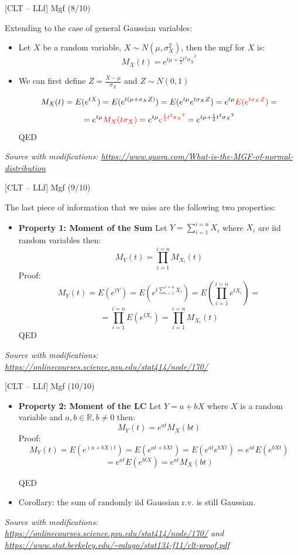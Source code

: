 \documentclass{beamer}
\begin{document}
\begin{frame}
{\centerline{[CLT -- LLf] Mgf (8/10)}}
Extending to the case of general Gaussian variables:
\begin{itemize}
\item Let $X$ be a random variable, $  X \sim N(\mu,\sigma_X^2)  $, then the mgf for $X$ is:
$$M_X(t) = e^{t\mu + \frac{1}{2}{t^2\sigma_X}^2}$$

\item We can first define $Z = \frac{X - \mu}{ \sigma_X}$ and $  Z \sim N(0,1) $

$$M_X(t) = E(e^{tX}) = E(e^{t(\mu + \sigma_XZ)}) =  E(e^{t\mu} e^{t\sigma_XZ}) = e^{t\mu} \textcolor{red}{E(e^{t\sigma_XZ})} =$$
$$ = e^{t\mu} \textcolor{red}{M_X(t\sigma_X)} =  e^{t\mu} \textcolor{red}{e^{\frac{1}{2}{t^2\sigma_X}^2}}= e^{t\mu + \frac{1}{2}{t^2\sigma_X}^2}$$
QED
\end{itemize}

\textit{\small
Source with modifications: \url{https://www.quora.com/What-is-the-MGF-of-normal-distribution}}
\end{frame}

\begin{frame}
{\centerline{[CLT -- LLf] Mgf (9/10)}}\label{S:MomentOfSum}
The last piece of information that we miss are the following two properties:
\begin{itemize}
\item  \textbf{Property 1: Moment of the Sum} Let $Y = \sum_{i=1}^{i=n} X_i$ where  $X_i$ are iid random variables then:
$$M_Y(t) = \prod_{i=1}^{i=n} M_{X_i}(t)$$
Proof:
$$M_Y(t) = E(e^{tY}) = E(e^{t\sum_{i=1}^{i=n} X_i}) = E(\prod_{i=1}^{i=n}e^{tX_i})=$$
$$ = \prod_{i=1}^{i=n}E(e^{tX_i})=\prod_{i=1}^{i=n} M_{X_i}(t)$$
QED
\end{itemize}

\textit{\tiny
Source with modifications: \url{https://onlinecourses.science.psu.edu/stat414/node/170/}}
\end{frame}

\begin{frame}
{\centerline{[CLT -- LLf] Mgf (10/10)}}\label{S:MomentOfLC}
\begin{itemize}
\item \textbf{Property 2: Moment of the LC} Let $Y = a + bX$ where  $X$ is a random variable and $a, b \in \mathbb{R}, b \neq 0$ then:
$$M_Y(t) =  e^{at}M_{X}(bt)$$
Proof:
$$M_Y(t) =  E(e^{(a + bX)t}) = E(e^{at + bXt})= E(e^{at}e^{bXt}) = e^{at}E(e^{bXt})$$
$$= e^{at}E(e^{btX}) = e^{at}M_{X}(bt) $$

QED
\item Corollary: the sum of randomly iid Gaussian r.v. is still Gaussian.
\end{itemize}

\textit{\tiny
\vspace{-\baselineskip}
Source with modifications: \url{https://onlinecourses.science.psu.edu/stat414/node/170/} and \url{https://www.stat.berkeley.edu/~mlugo/stat134-f11/clt-proof.pdf}}
\end{frame}
\end{document}
